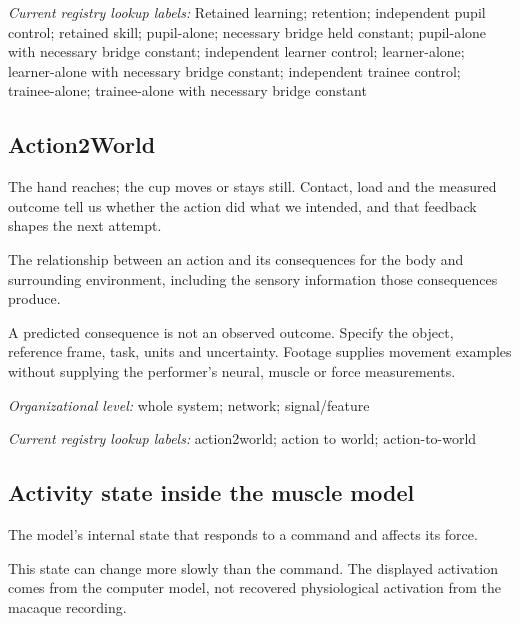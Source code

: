 \noindent\textit{Current registry lookup labels:} Retained learning; retention; independent pupil control; retained skill; pupil-alone; necessary bridge held constant; pupil-alone with necessary bridge constant; independent learner control; learner-alone; learner-alone with necessary bridge constant; independent trainee control; trainee-alone; trainee-alone with necessary bridge constant\par

\begin{samepage}
\subsection*{Action2World}
\noindent The hand reaches; the cup moves or stays still. Contact, load and the measured outcome tell us whether the action did what we intended, and that feedback shapes the next attempt.\par
\end{samepage}
\noindent The relationship between an action and its consequences for the body and surrounding environment, including the sensory information those consequences produce.\par
\noindent A predicted consequence is not an observed outcome. Specify the object, reference frame, task, units and uncertainty. Footage supplies movement examples without supplying the performer's neural, muscle or force measurements.\par
\begin{samepage}
\noindent\textit{Organizational level:} whole system; network; signal/feature\par\nopagebreak[4]

\end{samepage}


\noindent\textit{Current registry lookup labels:} action2world; action to world; action-to-world\par

\begin{samepage}
\subsection*{Activity state inside the muscle model}
\noindent The model’s internal state that responds to a command and affects its force.\par
\end{samepage}
\begin{samepage}
\noindent This state can change more slowly than the command. The displayed activation comes from the computer model, not recovered physiological activation from the macaque recording.\par\nopagebreak[4]

\end{samepage}


